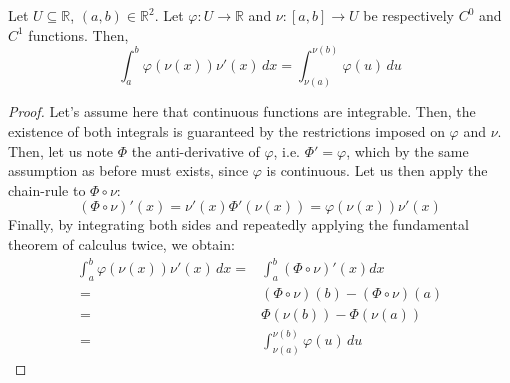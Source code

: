 \documentclass[solutions.tex]{subfiles}
\begin{document}
\begin{theorem}
Let $U \subseteq \mathbb{R}$, $(a, b)\in\mathbb{R}^2$. Let
$\varphi : U \rightarrow \mathbb{R}$ and $\nu : [a, b] \rightarrow U$
be respectively $C^0$ and $C^1$ functions. Then,
\[
	\boxed{\int_a^b\varphi(\nu(x))\nu'(x)\,dx = \int_{\nu(a)}^{\nu(b)}\varphi(u)\,du}
\]
\end{theorem}
\begin{proof}
Let's assume here that continuous functions are integrable. Then,
the existence of both integrals is guaranteed by
the restrictions imposed on $\varphi$ and $\nu$. \\

Then, let us note $\Phi$ the anti-derivative of $\varphi$, i.e.
$\Phi' = \varphi$, which by the same assumption as before must exists,
since $\varphi$ is continuous. Let us then apply the chain-rule to
$\Phi \circ \nu$:
\[
	(\Phi \circ \nu)'(x) = \nu'(x)\Phi'(\nu(x)) = \varphi(\nu(x))\nu'(x)
\]
Finally, by integrating both sides and repeatedly applying the fundamental
theorem of calculus twice, we obtain:
\begin{equation*} \begin{aligned}
	\int_a^b\varphi(\nu(x))\nu'(x)\,dx =& \int_a^b(\Phi \circ \nu)'(x)dx \\
	~ =& (\Phi \circ \nu)(b)-(\Phi \circ \nu)(a) \\
	~ =& \Phi(\nu(b)) - \Phi(\nu(a)) \\
	~ =& \int_{\nu(a)}^{\nu(b)}\varphi(u)\,du
\end{aligned} \end{equation*}
\end{proof}
\end{document}
